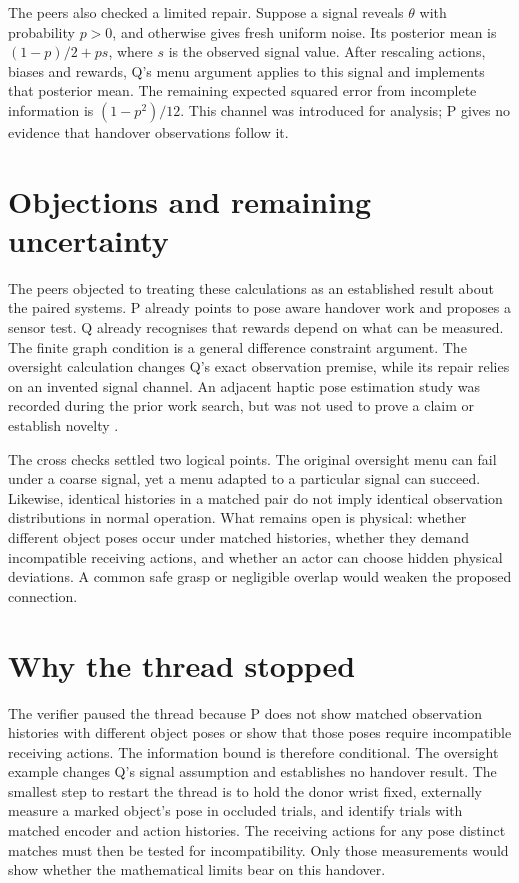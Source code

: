 \documentclass{article}
\begin{document}
The peers also checked a limited repair. Suppose a signal reveals \(\theta\) with probability
\(p>0\), and otherwise gives fresh uniform noise. Its posterior mean is \((1-p)/2+ps\), where \(s\)
is the observed signal value. After rescaling actions, biases and rewards, Q's menu argument applies
to this signal and implements that posterior mean. The remaining expected squared error from
incomplete information is \((1-p^2)/12\). This channel was introduced for analysis; P gives no
evidence that handover observations follow it.

\section{Objections and remaining uncertainty}

The peers objected to treating these calculations as an established result about the paired systems.
P already points to pose aware handover work and proposes a sensor test. Q already recognises that
rewards depend on what can be measured. The finite graph condition is a general difference
constraint argument. The oversight calculation changes Q's exact observation premise, while its
repair relies on an invented signal channel. An adjacent haptic pose estimation study was recorded
during the prior work search, but was not used to prove a claim or establish novelty \cite{haptic}.

The cross checks settled two logical points. The original oversight menu can fail under a coarse
signal, yet a menu adapted to a particular signal can succeed. Likewise, identical histories in a
matched pair do not imply identical observation distributions in normal operation. What remains open
is physical: whether different object poses occur under matched histories, whether they demand
incompatible receiving actions, and whether an actor can choose hidden physical deviations. A common
safe grasp or negligible overlap would weaken the proposed connection.

\clearpage
\section{Why the thread stopped}

The verifier paused the thread because P does not show matched observation histories with different
object poses or show that those poses require incompatible receiving actions. The information bound
is therefore conditional. The oversight example changes Q's signal assumption and establishes no
handover result. The smallest step to restart the thread is to hold the donor wrist fixed,
externally measure a marked object's pose in occluded trials, and identify trials with matched
encoder and action histories. The receiving actions for any pose distinct matches must then be
tested for incompatibility. Only those measurements would show whether the mathematical limits bear
on this handover.



\end{document}
